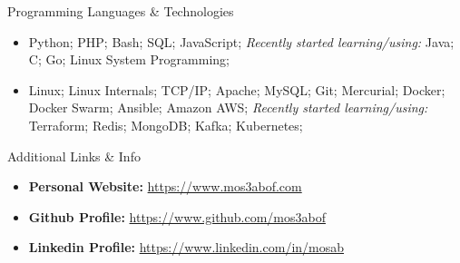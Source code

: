 \documentclass[]{mosabcv}
\begin{document}
    \begin{cvsection}{Programming Languages \& Technologies}
        \begin{cvsubsection}{}{}{}
            \begin{itemize}
				\item Python; PHP; Bash; SQL; JavaScript; \textit{Recently started learning/using:} Java; C; Go; Linux System Programming;
				\item Linux; Linux Internals; TCP/IP; Apache; MySQL; Git; Mercurial; Docker; Docker Swarm; Ansible; Amazon AWS; \textit{Recently started learning/using:} Terraform; Redis; MongoDB; Kafka; Kubernetes;
            \end{itemize}
        \end{cvsubsection}
    \end{cvsection}

    \begin{cvsection}{Additional Links \& Info}
        \begin{cvsubsection}{}{}{}
            \begin{itemize}
                \item \textbf{Personal Website:} \href{https://www.mos3abof.com}{https://www.mos3abof.com}
                \item \textbf{Github Profile:} \href{https://www.github.com/mos3abof}{https://www.github.com/mos3abof}
                \item \textbf{Linkedin Profile:} \href{https://www.linkedin.com/in/mosab}{https://www.linkedin.com/in/mosab}
            \end{itemize}
        \end{cvsubsection}
    \end{cvsection}
\end{document}
